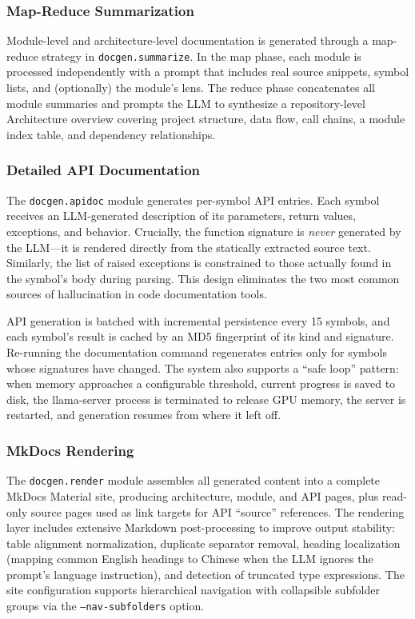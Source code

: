 \documentclass[10pt,twocolumn]{article}
\begin{document}
\subsubsection{Map-Reduce Summarization}
Module-level and architecture-level documentation is generated through a map-reduce strategy in \texttt{docgen.summarize}. In the map phase, each module is processed independently with a prompt that includes real source snippets, symbol lists, and (optionally) the module's lens. The reduce phase concatenates all module summaries and prompts the LLM to synthesize a repository-level Architecture overview covering project structure, data flow, call chains, a module index table, and dependency relationships.

\subsubsection{Detailed API Documentation}
The \texttt{docgen.apidoc} module generates per-symbol API entries. Each symbol receives an LLM-generated description of its parameters, return values, exceptions, and behavior. Crucially, the function signature is \emph{never} generated by the LLM---it is rendered directly from the statically extracted source text. Similarly, the list of raised exceptions is constrained to those actually found in the symbol's body during parsing. This design eliminates the two most common sources of hallucination in code documentation tools.

API generation is batched with incremental persistence every 15 symbols, and each symbol's result is cached by an MD5 fingerprint of its kind and signature. Re-running the documentation command regenerates entries only for symbols whose signatures have changed. The system also supports a ``safe loop'' pattern: when memory approaches a configurable threshold, current progress is saved to disk, the llama-server process is terminated to release GPU memory, the server is restarted, and generation resumes from where it left off.

\subsubsection{MkDocs Rendering}
The \texttt{docgen.render} module assembles all generated content into a complete MkDocs Material site, producing architecture, module, and API pages, plus read-only source pages used as link targets for API ``source'' references. The rendering layer includes extensive Markdown post-processing to improve output stability: table alignment normalization, duplicate separator removal, heading localization (mapping common English headings to Chinese when the LLM ignores the prompt's language instruction), and detection of truncated type expressions. The site configuration supports hierarchical navigation with collapsible subfolder groups via the \texttt{--nav-subfolders} option.
\end{document}
